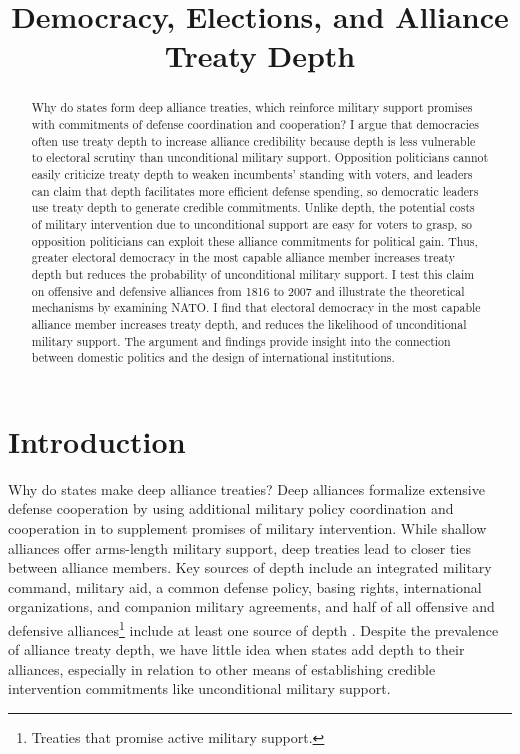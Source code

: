 \documentclass[12pt]{article}
\title{\textbf{Democracy, Elections, and Alliance Treaty Depth}}
\date{ }
\begin{document}
\maketitle 

\doublespace 

\begin{abstract}
Why do states form deep alliance treaties, which reinforce military support promises with commitments of defense coordination and cooperation? 
I argue that democracies often use treaty depth to increase alliance credibility because depth is less vulnerable to electoral scrutiny than unconditional military support. 
Opposition politicians cannot easily criticize treaty depth to weaken incumbents' standing with voters, and leaders can claim that depth facilitates more efficient defense spending, so democratic leaders use treaty depth to generate credible commitments. 
Unlike depth, the potential costs of military intervention due to unconditional support are easy for voters to grasp, so opposition politicians can exploit these alliance commitments for political gain. 
Thus, greater electoral democracy in the most capable alliance member increases treaty depth but reduces the probability of unconditional military support. 
I test this claim on offensive and defensive alliances from 1816 to 2007 and illustrate the theoretical mechanisms by examining NATO. 
I find that electoral democracy in the most capable alliance member increases treaty depth, and reduces the likelihood of unconditional military support. 
The argument and findings provide insight into the connection between domestic politics and the design of international institutions. 
\end{abstract}


\newpage 


\section{Introduction}


Why do states make deep alliance treaties? 
Deep alliances formalize extensive defense cooperation by using additional military policy coordination and cooperation in to supplement promises of military intervention. 
While shallow alliances offer arms-length military support, deep treaties lead to closer ties between alliance members. 
Key sources of depth include an integrated military command, military aid, a common defense policy, basing rights, international organizations, and companion military agreements, and half of all offensive and defensive alliances\footnote{Treaties that promise active military support.} include at least one source of depth \citep{Leedsetal2002}. 
Despite the prevalence of alliance treaty depth, we have little idea when states add depth to their alliances, especially in relation to other means of establishing credible intervention commitments like unconditional military support. 
\end{document}
